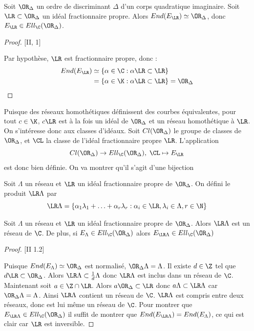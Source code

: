 \begin{Prop}
	Soit $\OR_{\Delta}$ un ordre de discriminant $\Delta$ d'un corps quadratique imaginaire. Soit $\LR\subset\OR_{\Delta}$ un idéal fractionnaire propre. Alors $End(E_{\LR})\simeq\OR_{\Delta}$, donc $E_{\LR}\in Ell_{\C}(\OR_{\Delta})$.
\end{Prop}

\begin{proof}\cite{Sil94}[II, 1]
	
	Par hypothèse, $\LR$ est fractionnaire propre, donc :
	\begin{align*}
		End(E_{\LR})&\simeq\left\lbrace\alpha\in\C : \alpha\LR\subset\LR\right\rbrace\\
		&= \left\lbrace\alpha\in\K : \alpha\LR\subset\LR\right\rbrace = \OR_{\Delta}
	\end{align*}
\end{proof}

Puisque des réseaux homothétiques définissent des courbes équivalentes, pour tout $c\in\K$, $c\LR$ est à la fois un idéal de $\OR_{\Delta}$ et un réseau homothétique à $\LR$. On s'intéresse donc aux classes d'idéaux. Soit $Cl(\OR_{\Delta})$ le groupe de classes de $\OR_{\Delta}$, et $\CL$ la classe de l'idéal fractionnaire propre $\LR$. L'application
\begin{equation*}
	Cl(\OR_{\Delta})\rightarrow Ell_{\C}(\OR_{\Delta}),\; \CL\mapsto E_{\LR}
\end{equation*} 
est donc bien définie. On va montrer qu'il s'agit d'une bijection

\begin{Def}
	Soit $\Lambda$ un réseau et $\LR$ un idéal fractionnaire propre de $\OR_{\Delta}$. On défini le produit $\LR\Lambda$ par
	\begin{equation*}
		\LR\Lambda = \left\lbrace \alpha_1\lambda_1 + \ldots + \alpha_r\lambda_r : \alpha_i\in\LR , \lambda_i\in\Lambda , r\in\N\right\rbrace 
	\end{equation*}
\end{Def}

\begin{Prop}
	Soit $\Lambda$ un réseau et $\LR$ un idéal fractionnaire propre de $\OR_{\Delta}$. Alors $\LR\Lambda$ est un réseau de $\C$. De plus, si $E_{\Lambda}\in Ell_{\C}(\OR_{\Delta})$ alors $E_{\LR\Lambda}\in Ell_{\C}(\OR_{\Delta})$
\end{Prop}

\begin{proof}\cite{Sil94}[II 1.2]
	
	Puisque $End(E_{\Lambda}) \simeq \OR_{\Delta}$ est normalisé,  $\OR_{\Delta}\Lambda = \Lambda$. Il existe $d\in\Z$ tel que $d\LR\subset\OR_{\Delta}$. Alors $\LR\Lambda\subset\frac{1}{d}\Lambda$ donc $\LR\Lambda$ est inclus dans un réseau de $\C$. 
	Maintenant soit $a\in\Z\cap\LR$. Alors $a\OR_{\Delta}\subset\LR$ donc $a\Lambda\subset\LR\Lambda$ car $\OR_{\Delta}\Lambda = \Lambda$. Ainsi $\LR\Lambda$ contient un réseau de $\C$. $\LR\Lambda$ est compris entre deux réseaux, donc est lui même un réseau de $\C$.
	Pour montrer que $E_{\LR\Lambda}\in Ell_{\C}(\OR_{\Delta})$ il suffit de montrer que $End(E_{\LR\Lambda}) = End(E_{\Lambda})$, ce qui est clair car $\LR$ est inversible. 
\end{proof}

